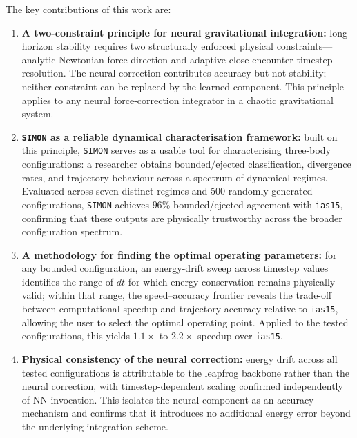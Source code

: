 \documentclass[12pt]{article}
\begin{document}
The key contributions of this work are:
\begin{enumerate}

    \item \textbf{A two-constraint principle for neural gravitational
    integration:} long-horizon stability requires two structurally
    enforced physical constraints---analytic Newtonian force direction
    and adaptive close-encounter timestep resolution. The neural
    correction contributes accuracy but not stability; neither constraint
    can be replaced by the learned component. This principle applies to
    any neural force-correction integrator in a chaotic gravitational
    system.

    \item \textbf{\texttt{SIMON} as a reliable dynamical characterisation
    framework:} built on this principle, \texttt{SIMON} serves as a
    usable tool for characterising three-body configurations: a
    researcher obtains bounded/ejected classification, divergence rates,
    and trajectory behaviour across a spectrum of dynamical regimes.
    Evaluated across seven distinct regimes and 500 randomly generated
    configurations, \texttt{SIMON} achieves $96\%$ bounded/ejected
    agreement with \texttt{ias15}, confirming that these outputs are
    physically trustworthy across the broader configuration spectrum.

    \item \textbf{A methodology for finding the optimal operating
    parameters:} for any bounded configuration, an energy-drift sweep
    across timestep values identifies the range of $dt$ for which energy
    conservation remains physically valid; within that range, the
    speed--accuracy frontier reveals the trade-off between computational
    speedup and trajectory accuracy relative to \texttt{ias15}, allowing
    the user to select the optimal operating point. Applied to the tested
    configurations, this yields $1.1\times$ to $2.2\times$ speedup over
    \texttt{ias15}.

    \item \textbf{Physical consistency of the neural correction:} energy
    drift across all tested configurations is attributable to the
    leapfrog backbone rather than the neural correction, with
    timestep-dependent scaling confirmed independently of NN invocation.
    This isolates the neural component as an accuracy mechanism and
    confirms that it introduces no additional energy error beyond the
    underlying integration scheme.

\end{enumerate}
\end{document}
